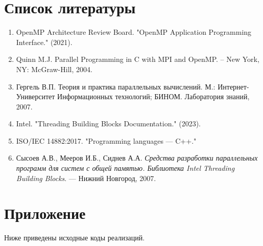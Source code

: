 \documentclass[a4paper,12pt]{article}
\begin{document}
\section{Список литературы}
\begin{enumerate}
    \item OpenMP Architecture Review Board. "OpenMP Application Programming Interface." (2021).
    \item Quinn M.J. Parallel Programming in C with MPI and OpenMP. – New York, NY: McGraw-Hill, 2004.
    \item Гергель В.П. Теория и практика параллельных вычислений. М.: Интернет-Университет Информационных технологий; БИНОМ. Лаборатория знаний, 2007.
    \item Intel. "Threading Building Blocks Documentation." (2023).
    \item ISO/IEC 14882:2017. "Programming languages — C++."
    \item Сысоев А.В., Мееров И.Б., Сиднев А.А. \textit{Средства разработки параллельных программ для систем с общей памятью. Библиотека Intel Threading Building Blocks}. — Нижний Новгород, 2007.
\end{enumerate}

\section{Приложение}
Ниже приведены исходные коды реализаций.
\end{document}
